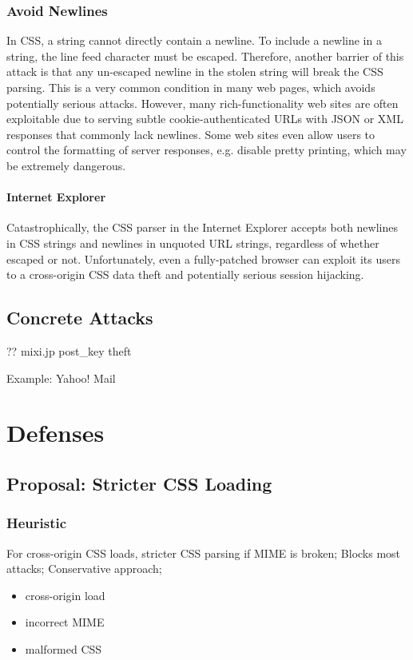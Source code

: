 \documentclass{acm_proc_article-sp}
\begin{document}
\subsubsection{Avoid Newlines}
In CSS, a string cannot directly contain a newline. To include a newline in a string, the line feed character must be escaped. Therefore, another barrier of this attack is that any un-escaped newline in the stolen string will break the CSS parsing. This is a very common condition in many web pages, which avoids potentially serious attacks. However, many rich-functionality web sites are often exploitable due to serving subtle cookie-authenticated URLs with JSON or XML responses that commonly lack newlines. Some web sites even allow users to control the formatting of server responses, e.g. disable pretty printing, which may be extremely dangerous.
\paragraph{Internet Explorer}
Catastrophically, the CSS parser in the Internet Explorer accepts both newlines in CSS strings and newlines in unquoted URL strings, regardless of whether escaped or not. Unfortunately, even a fully-patched browser can exploit its users to a cross-origin CSS data theft and potentially serious session hijacking.

\subsection{Concrete Attacks}
?? mixi.jp post\_key theft\cite{cssxss}

Example: Yahoo! Mail

\section{Defenses}

\subsection{Proposal: Stricter CSS Loading}
\subsubsection{Heuristic}
For cross-origin CSS loads, stricter CSS parsing if MIME is broken;
Blocks most attacks;
Conservative approach;
\begin{itemize}
\item{cross-origin load}
\item{incorrect MIME}
\item{malformed CSS}
\end{itemize}
\end{document}
